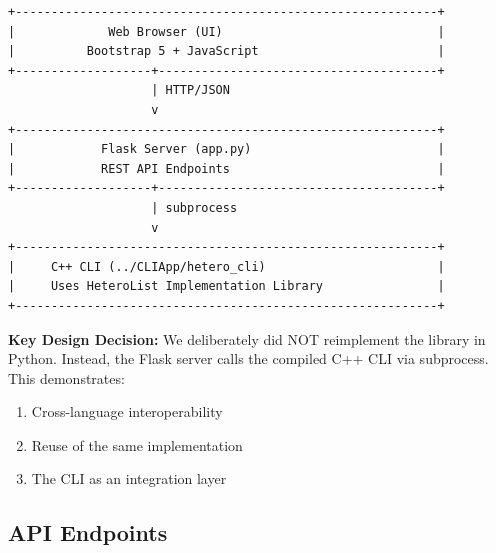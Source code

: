 \documentclass[11pt,a4paper]{article}
\begin{document}
\begin{verbatim}
+-----------------------------------------------------------+
|             Web Browser (UI)                              |
|          Bootstrap 5 + JavaScript                         |
+-------------------+---------------------------------------+
                    | HTTP/JSON
                    v
+-----------------------------------------------------------+
|            Flask Server (app.py)                          |
|            REST API Endpoints                             |
+-------------------+---------------------------------------+
                    | subprocess
                    v
+-----------------------------------------------------------+
|     C++ CLI (../CLIApp/hetero_cli)                        |
|     Uses HeteroList Implementation Library                |
+-----------------------------------------------------------+
\end{verbatim}

\textbf{Key Design Decision:} We deliberately did NOT reimplement the library in Python. Instead, the Flask server calls the compiled C++ CLI via subprocess. This demonstrates:
\begin{enumerate}
    \item Cross-language interoperability
    \item Reuse of the same implementation
    \item The CLI as an integration layer
\end{enumerate}

\subsection{API Endpoints}
\end{document}
